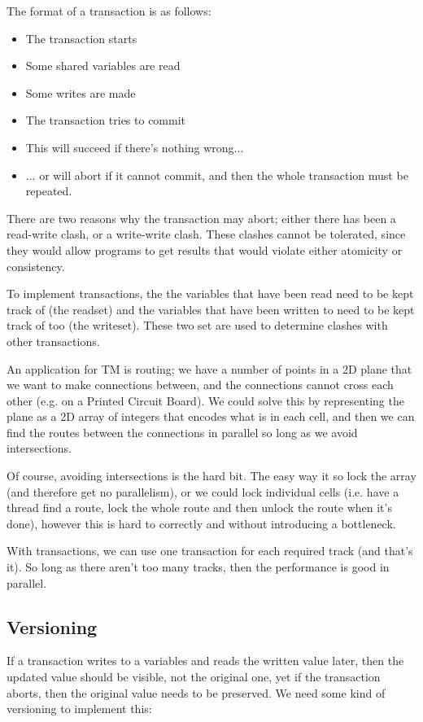 The format of a transaction is as follows:

\begin{itemize}
\item The transaction starts
\item Some shared variables are read
\item Some writes are made
\item The transaction tries to commit
\item This will succeed if there's nothing wrong...
\item ... or will abort if it cannot commit, and then the whole transaction must be repeated.
\end{itemize}

There are two reasons why the transaction may abort; either there has
been a read-write clash, or a write-write clash. These clashes cannot
be tolerated, since they would allow programs to get results that
would violate either atomicity or consistency.

To implement transactions, the the variables that have been read need
to be kept track of (the readset) and the variables that have been
written to need to be kept track of too (the writeset). These two set
are used to determine clashes with other transactions.

An application for TM is routing; we have a number of points in a 2D
plane that we want to make connections between, and the connections
cannot cross each other (e.g. on a Printed Circuit Board). We could
solve this by representing the plane as a 2D array of integers that
encodes what is in each cell, and then we can find the routes between
the connections in parallel so long as we avoid intersections.

Of course, avoiding intersections is the hard bit. The easy way it so
lock the array (and therefore get no parallelism), or we could lock
individual cells (i.e. have a thread find a route, lock the whole
route and then unlock the route when it's done), however this is hard
to correctly and without introducing a bottleneck.

With transactions, we can use one transaction for each required
track (and that's it). So long as there aren't too many tracks, then
the performance is good in parallel.

\subsection{Versioning}

If a transaction writes to a variables and reads the written value
later, then the updated value should be visible, not the original
one, yet if the transaction aborts, then the original
value needs to be preserved. We need some kind of versioning to
implement this:


